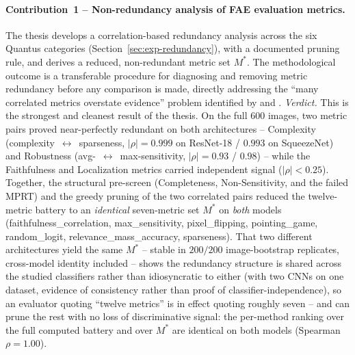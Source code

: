 \paragraph{Contribution~1 -- Non-redundancy analysis of FAE evaluation
metrics.}
The thesis develops a correlation-based redundancy analysis across the six
Quantus categories (Section~\ref{sec:exp-redundancy}), with a documented
pruning rule, and derives a reduced, non-redundant metric set $M^{*}$. The
methodological outcome is a transferable procedure for diagnosing and removing
metric redundancy before any comparison is made, directly addressing the
``many correlated metrics overstate evidence'' problem identified by
\citet{tomsett2020sanity} and \citet{pawlicki2024necessity}.
\emph{Verdict.} This is the strongest and cleanest result of the thesis. On the
full 600 images, two metric pairs proved near-perfectly redundant on both
architectures -- Complexity (complexity~$\leftrightarrow$~sparseness,
$|\rho| = 0.999$ on ResNet-18 / $0.993$ on SqueezeNet) and Robustness
(avg-~$\leftrightarrow$~max-sensitivity, $|\rho| = 0.93$ / $0.98$) -- while the
Faithfulness and Localization metrics carried independent signal
($|\rho| < 0.25$). Together, the structural pre-screen (Completeness,
Non-Sensitivity, and the failed MPRT) and the greedy pruning of the two
correlated pairs reduced the twelve-metric battery to an
\emph{identical} seven-metric set $M^{*}$ on \emph{both} models
(faithfulness\_correlation, max\_sensitivity, pixel\_flipping, pointing\_game,
random\_logit, relevance\_mass\_accuracy, sparseness). That two different
architectures yield the same $M^{*}$ -- stable in $200/200$ image-bootstrap
replicates, cross-model identity included -- shows the redundancy structure
is shared across the studied classifiers rather than idiosyncratic to
either (with two CNNs on one dataset, evidence of consistency rather than
proof of classifier-independence), so an evaluator quoting ``twelve
metrics'' is in effect quoting roughly seven -- and can prune the rest with no
loss of discriminative signal: the per-method ranking over the full computed
battery and over $M^{*}$ are identical on both models
(Spearman $\rho = 1.00$).

